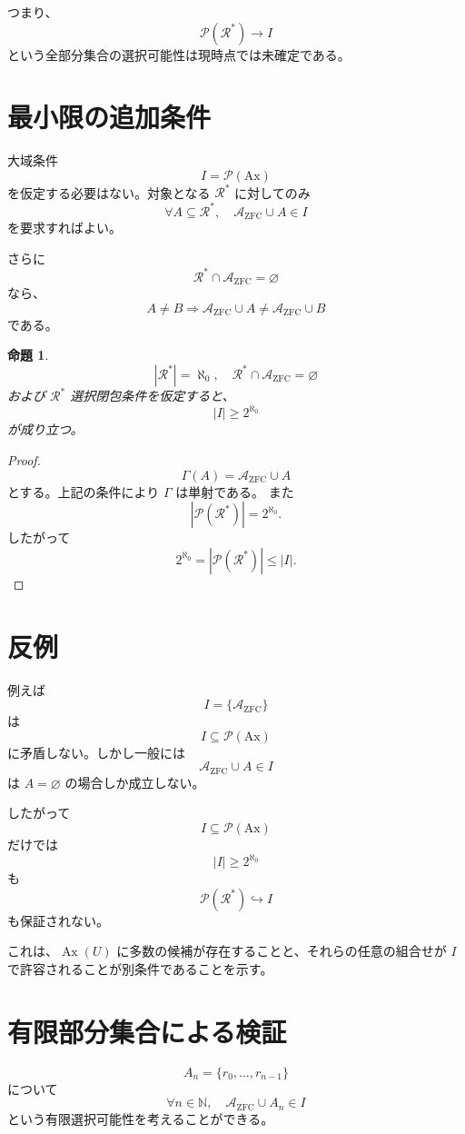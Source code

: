 \documentclass[a4paper,11pt]{article}
\newtheorem{proposition}[definition]{命題}
\newcommand{\Ax}{\mathrm{Ax}}
\begin{document}
つまり、
\[
\mathcal{P}(\mathcal{R}^*)\longrightarrow I
\]
という全部分集合の選択可能性は現時点では未確定である。

\section{最小限の追加条件}
大域条件
\[
I=\mathcal{P}(\Ax)
\]
を仮定する必要はない。対象となる $\mathcal{R}^*$ に対してのみ
\[
\forall A\subseteq\mathcal{R}^*,
\quad
\mathcal{A}_{\mathrm{ZFC}}\cup A\in I
\]
を要求すればよい。

さらに
\[
\mathcal{R}^*\cap\mathcal{A}_{\mathrm{ZFC}}=\varnothing
\]
なら、
\[
A\neq B\Longrightarrow
\mathcal{A}_{\mathrm{ZFC}}\cup A\neq
\mathcal{A}_{\mathrm{ZFC}}\cup B
\]
である。

\begin{proposition}
\[
|\mathcal{R}^*|=\aleph_0,
\quad
\mathcal{R}^*\cap\mathcal{A}_{\mathrm{ZFC}}=\varnothing
\]
および $\mathcal{R}^*$ 選択閉包条件を仮定すると、
\[
\boxed{|I|\ge2^{\aleph_0}}
\]
が成り立つ。
\end{proposition}

\begin{proof}
\[
\Gamma(A)=\mathcal{A}_{\mathrm{ZFC}}\cup A
\]
とする。上記の条件により $\Gamma$ は単射である。
また
\[
|\mathcal{P}(\mathcal{R}^*)|
=2^{\aleph_0}.
\]
したがって
\[
2^{\aleph_0}
=
|\mathcal{P}(\mathcal{R}^*)|
\le |I|.
\]
\end{proof}

\section{反例}
例えば
\[
I=\{\mathcal{A}_{\mathrm{ZFC}}\}
\]
は
\[
I\subseteq\mathcal{P}(\Ax)
\]
に矛盾しない。しかし一般には
\[
\mathcal{A}_{\mathrm{ZFC}}\cup A\in I
\]
は $A=\varnothing$ の場合しか成立しない。

したがって
\[
I\subseteq\mathcal{P}(\Ax)
\]
だけでは
\[
|I|\ge2^{\aleph_0}
\]
も
\[
\mathcal{P}(\mathcal{R}^*)\hookrightarrow I
\]
も保証されない。

これは、$\operatorname{Ax}(U)$ に多数の候補が存在することと、それらの任意の組合せが $I$ で許容されることが別条件であることを示す。

\section{有限部分集合による検証}
\[
A_n=\{r_0,\ldots,r_{n-1}\}
\]
について
\[
\forall n\in\mathbb{N},\quad
\mathcal{A}_{\mathrm{ZFC}}\cup A_n\in I
\]
という有限選択可能性を考えることができる。
\end{document}
